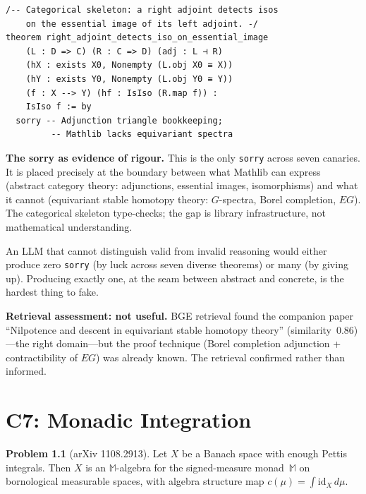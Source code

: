 \documentclass[12pt,oneside]{book}
\theoremstyle{plain}
\theoremstyle{definition}
\newtheorem{problem}{Problem}[chapter]
\theoremstyle{remark}
\begin{document}
\begin{leanbox}
\begin{Verbatim}[fontsize=\small]
/-- Categorical skeleton: a right adjoint detects isos
    on the essential image of its left adjoint. -/
theorem right_adjoint_detects_iso_on_essential_image
    (L : D => C) (R : C => D) (adj : L ⊣ R)
    (hX : exists X0, Nonempty (L.obj X0 ≅ X))
    (hY : exists Y0, Nonempty (L.obj Y0 ≅ Y))
    (f : X --> Y) (hf : IsIso (R.map f)) :
    IsIso f := by
  sorry -- Adjunction triangle bookkeeping;
         -- Mathlib lacks equivariant spectra
\end{Verbatim}
\end{leanbox}

\begin{notebox}
\textbf{The sorry as evidence of rigour.} This is the only
\texttt{sorry} across seven canaries. It is placed precisely at the
boundary between what Mathlib can express (abstract category theory:
adjunctions, essential images, isomorphisms) and what it cannot
(equivariant stable homotopy theory: $G$-spectra, Borel completion,
$EG$). The categorical skeleton type-checks; the gap is library
infrastructure, not mathematical understanding.

An LLM that cannot distinguish valid from invalid reasoning would
either produce zero \texttt{sorry} (by luck across seven diverse
theorems) or many (by giving up). Producing exactly one, at the
seam between abstract and concrete, is the hardest thing to fake.

\medskip
\textbf{Retrieval assessment: not useful.} BGE retrieval found
the companion paper ``Nilpotence and descent in equivariant stable
homotopy theory'' (similarity~0.86)---the right domain---but the
proof technique (Borel completion adjunction + contractibility of
$EG$) was already known. The retrieval confirmed rather than informed.
\end{notebox}

\chapter{C7: Monadic Integration}\label{ch:c7}

\begin{problem}[arXiv 1108.2913]
Let $X$ be a Banach space with enough Pettis integrals. Then $X$ is an
$\mathbb{M}$-algebra for the signed-measure monad~$\mathbb{M}$ on
bornological measurable spaces, with algebra structure map
$c(\mu) = \int \mathrm{id}_X \, d\mu$.
\end{problem}
\end{document}
